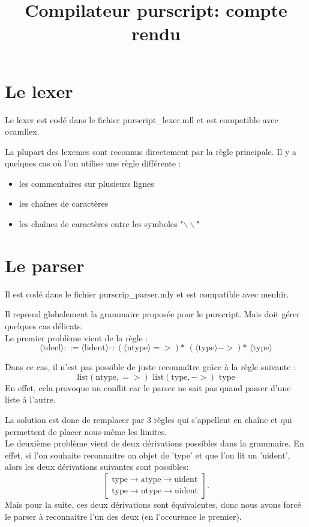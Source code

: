 \documentclass[12pt,a4paper,french]{article}
\title{Compilateur purscript: compte rendu}
\begin{document}
\maketitle

\part*{Le lexer}
Le lexer est codé dans le fichier purscript\_lexer.mll et est compatible avec ocamllex.

La plupart des lexemes sont reconnus directement par la règle principale. Il y a quelques cas où l'on utilise une règle différente :

\begin{itemize}
\item les commentaires sur plusieurs lignes
\item les chaînes de caractères
\item les chaînes de caractères entre les symboles "$\backslash\backslash$"
\end{itemize}


\part*{Le parser}
Il est codé dans le fichier purscrip\_parser.mly et est compatible avec menhir.

Il reprend globalement la grammaire proposée pour le purscript. Mais doit gérer quelques cas délicats. \\

Le premier problème vient de la règle :
\[ \langle\text{tdecl}\rangle ::= \langle \text{lident}\rangle :: (\langle\text{ntype}\rangle =>)\text{* } (\langle\text{type}\rangle ->)\text{* } \langle\text{type}\rangle \]

Dans ce cas, il n'est pas possible de juste reconnaître grâce à la règle suivante :
\[  \text{list}(\text{ntype}, =>) \text{ list}(\text{type}, ->) \text{ type} \]
En effet, cela provoque un conflit car le parser ne sait pas quand passer d'une liste à l'autre.

La solution est donc de remplacer par 3 règles qui s'appellent en chaîne et qui permettent de placer nous-même les limites.
\\
Le deuxième problème vient de deux dérivations possibles dans la grammaire. En effet, si l'on souhaite reconnaitre on objet de 'type' et que l'on lit un 'uident', alors les deux dérivations suivantes sont possibles:
\[ \left[ \begin{array}{l}
	\text{type} \rightarrow \text{atype} \rightarrow \text{uident} \\
	\text{type} \rightarrow \text{ntype} \rightarrow \text{uident}
\end{array} \right].
\]
Mais pour la suite, ces deux dérivations sont équivalentes, donc nous avons forcé le parser à reconnaitre l'un des deux (en l'occurence le premier).
\end{document}
